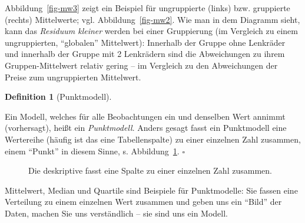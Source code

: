 \documentclass[
  letterpaper,
  oneside,
  open=any]{scrbook}
\theoremstyle{definition}
\theoremstyle{definition}
\theoremstyle{definition}
\newtheorem{definition}{Definition}[chapter]
\theoremstyle{remark}
\begin{document}
Abbildung~\ref{fig-mw3} zeigt ein Beispiel für ungruppierte (links) bzw.
gruppierte (rechts) Mittelwerte; vgl. Abbildung~\ref{fig-mw2}. Wie man
in dem Diagramm sieht, kann das \emph{Residuum kleiner} werden bei einer
Gruppierung (im Vergleich zu einem ungruppierten, \enquote{globalen}
Mittelwert): Innerhalb der Gruppe ohne Lenkräder und innerhalb der
Gruppe mit 2 Lenkrädern sind die Abweichungen zu ihrem
Gruppen-Mittelwert relativ gering -- im Vergleich zu den Abweichungen
der Preise zum ungruppierten Mittelwert.

\begin{definition}[Punktmodell]\protect\hypertarget{def-punktmodell}{}\label{def-punktmodell}

Ein Modell, welches für alle Beobachtungen ein und denselben Wert
annimmt (vorhersagt), heißt ein \emph{Punktmodell}. Anders gesagt fasst
ein Punktmodell eine Wertereihe (häufig ist das eine Tabellenspalte) zu
einer einzelnen Zahl zusammen, einem \enquote{Punkt} in diesem Sinne, s.
Abbildung~\ref{fig-desk}. \(\square\)

\end{definition}

\begin{figure}


\caption{\label{fig-desk}Die deskriptive fasst eine Spalte zu einer
einzelnen Zahl zusammen.}

\end{figure}%

Mittelwert, Median und Quartile sind Beispiele für Punktmodelle: Sie
fassen eine Verteilung zu einem einzelnen Wert zusammen und geben uns
ein \enquote{Bild} der Daten, machen Sie uns verständlich -- sie sind
uns ein Modell.
\end{document}
